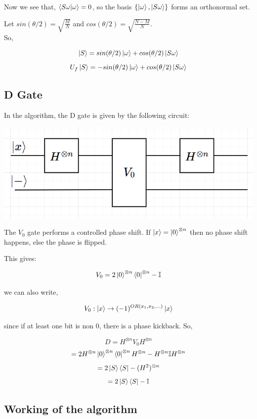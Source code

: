 \documentclass{article}
\begin{document}
            Now we see that, $\braket{S\omega|\omega} = 0$, so the basis $\{\ket{\omega}, \ket{S\omega}\}$
            forms an orthonormal set.

            Let $sin(\theta/2) = \sqrt{\frac{M}{N}}$ and $cos(\theta/2) = \sqrt{\frac{N-M}{N}}$.\\          So,
            
            $$\ket{S} = sin(\theta/2)\ket{\omega} + cos(\theta/2)\ket{S\omega}$$
            $$U_f\ket{S} = -sin(\theta/2)\ket{\omega} + cos(\theta/2)\ket{S\omega}$$
            
        \subsection{D Gate}
            In the algorithm, the D gate is given by the following circuit:
            
           {
           \centering
            \includegraphics[width = 8 cm]{D.png}\par
        }  
            The $V_0$ gate performs a controlled phase shift. If $\ket{x} = \ket{0}^{\otimes n}$ then 
            no phase shift happens, else the phase is flipped.

            This gives: 

            $$V_0 = 2\ket{0}^{\otimes n}\bra{0}^{\otimes n} - \mathbb{I}$$

            we can also write,
            
            $$V_0 : \ket{x} \rightarrow (-1)^{OR(x_1, x_2, ...)}\ket{x}$$

            since if at least one bit is non 0, there is a phase kickback. 
            So,
            
            $$D = H^{\otimes n}V_0H^{\otimes n}$$
            $$ = 2H^{\otimes n}\ket{0}^{\otimes n}\bra{0}^{\otimes n}H^{\otimes n} - H^{\otimes n}\mathbb{I}H^{\otimes n}$$
            $$ = 2\ket{S}\bra{S} - (H^2)^{\otimes n}$$
            $$ = 2\ket{S}\bra{S} - \mathbb{I}$$

        \subsection{Working of the algorithm}
\end{document}

